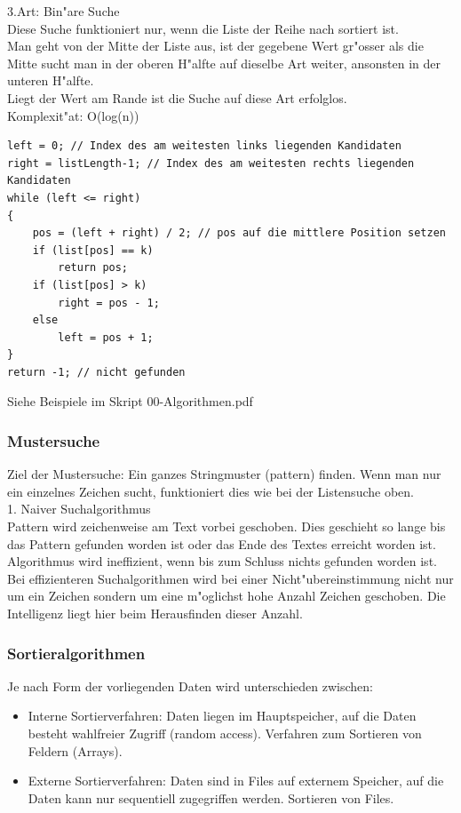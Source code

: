 3.Art: Bin"are Suche\\
Diese Suche funktioniert nur, wenn die Liste der Reihe nach sortiert ist.\\
Man geht von der Mitte der Liste aus, ist der gegebene Wert gr"osser als die Mitte sucht man in der oberen H"alfte auf dieselbe Art weiter, ansonsten in der unteren H"alfte.\\
Liegt der Wert am Rande ist die Suche auf diese Art erfolglos.\\
Komplexit"at: O(log(n))\\
\begin{lstlisting}[style=C]
left = 0; // Index des am weitesten links liegenden Kandidaten
right = listLength-1; // Index des am weitesten rechts liegenden Kandidaten
while (left <= right)
{
	pos = (left + right) / 2; // pos auf die mittlere Position setzen
	if (list[pos] == k)
		return pos;
	if (list[pos] > k)
		right = pos - 1;
	else
		left = pos + 1;
}
return -1; // nicht gefunden

\end{lstlisting} 
Siehe Beispiele im Skript 00-Algorithmen.pdf

\subsubsection{Mustersuche}
Ziel der Mustersuche: Ein ganzes Stringmuster (pattern) finden. Wenn man nur ein einzelnes Zeichen sucht, funktioniert dies wie bei der Listensuche oben.\\
1. Naiver Suchalgorithmus\\
Pattern wird zeichenweise am Text vorbei geschoben. Dies geschieht so lange bis das Pattern gefunden worden ist oder das Ende des Textes erreicht worden ist. Algorithmus wird ineffizient, wenn bis zum Schluss nichts gefunden worden ist.\\
Bei effizienteren Suchalgorithmen wird bei einer Nicht"ubereinstimmung nicht nur um ein Zeichen sondern um eine m"oglichst hohe Anzahl Zeichen geschoben. Die Intelligenz liegt hier beim Herausfinden dieser Anzahl.\\



\subsubsection{Sortieralgorithmen}
Je nach Form der vorliegenden Daten wird unterschieden zwischen: 
\begin{itemize}
\item Interne Sortierverfahren: Daten liegen im Hauptspeicher, auf die Daten besteht wahlfreier Zugriff (random access). Verfahren zum Sortieren von Feldern (Arrays).
\item Externe Sortierverfahren: Daten sind in Files auf externem Speicher, auf die Daten kann nur sequentiell zugegriffen werden. Sortieren von Files. 
\end{itemize}

